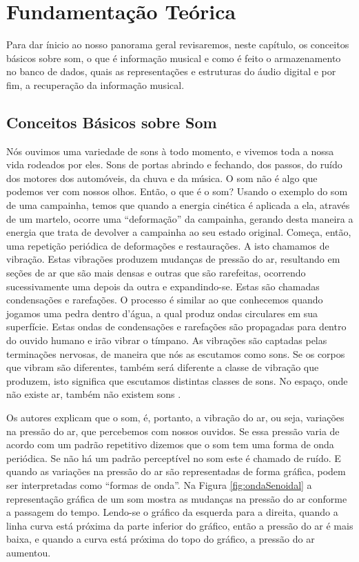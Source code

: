 \chapter{Fundamentação Teórica}
Para dar ínicio ao nosso panorama geral revisaremos, neste capítulo, os conceitos básicos sobre som, o que é informação musical e como é feito o armazenamento no banco de dados, quais as representações e estruturas do áudio digital e por fim, a recuperação da informação musical.

\section{Conceitos Básicos sobre Som}
Nós ouvimos uma variedade de sons à todo momento, e vivemos toda a nossa vida rodeados por eles. Sons de portas abrindo e fechando, dos passos, do ruído dos motores dos automóveis, da chuva e da música. O som não é algo que podemos ver com nossos olhos. Então, o que é o som? Usando o exemplo do som de uma campainha, temos que quando a energia cinética é aplicada a ela, através de um martelo, ocorre uma “deformação” da campainha, gerando desta maneira a energia que trata de devolver a campainha ao seu estado original. Começa, então, uma repetição periódica de deformações e restaurações. A isto chamamos de vibração. Estas vibrações produzem mudanças de pressão do ar, resultando em seções de ar que são mais densas e outras que são rarefeitas, ocorrendo sucessivamente uma depois da outra e expandindo-se. Estas são chamadas condensações e rarefações. O processo é similar ao que conhecemos quando jogamos uma pedra dentro d’água, a qual produz ondas circulares em sua superfície. Estas ondas de condensações e rarefações são propagadas para dentro do ouvido humano e irão vibrar o tímpano. As vibrações são captadas pelas terminações nervosas, de maneira que nós as escutamos como sons. Se os corpos que vibram são diferentes, também será diferente a classe de vibração que produzem, isto significa que escutamos distintas classes de sons. No espaço, onde não existe ar, também não existem sons \cite{miletto2004}.

Os autores explicam que o som, é, portanto, a vibração do ar, ou seja, variações na pressão do ar, que percebemos com nossos ouvidos. Se essa pressão varia de acordo com um padrão repetitivo dizemos que o som tem uma forma de onda periódica. Se não há um padrão perceptível no som este é chamado de ruído. E quando as variações na pressão do ar são representadas de forma gráfica, podem ser interpretadas como “formas de onda”. Na Figura \ref{fig:ondaSenoidal} a representação gráfica de um som mostra as mudanças na pressão do ar conforme a passagem do tempo. Lendo-se o gráfico da esquerda para a direita, quando a linha curva está próxima da parte inferior do gráfico, então a pressão do ar é mais baixa, e quando a curva está próxima do topo do gráfico, a pressão do ar aumentou.

